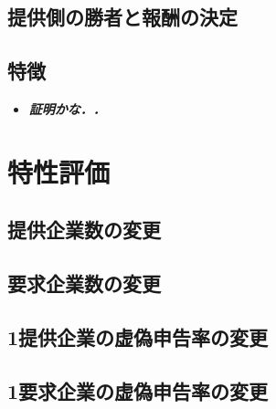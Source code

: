 \hypertarget{ux63d0ux4f9bux5074ux306eux52ddux8005ux3068ux5831ux916cux306eux6c7aux5b9a}{%
\subsection{提供側の勝者と報酬の決定}\label{ux63d0ux4f9bux5074ux306eux52ddux8005ux3068ux5831ux916cux306eux6c7aux5b9a}}

\hypertarget{ux7279ux5fb4-1}{%
\subsection{特徴}\label{ux7279ux5fb4-1}}

\begin{itemize}
\tightlist
\item
  \textbf{\emph{証明かな．．}}
\end{itemize}

\hypertarget{ux7279ux6027ux8a55ux4fa1-1}{%
\section{特性評価}\label{ux7279ux6027ux8a55ux4fa1-1}}

\hypertarget{ux63d0ux4f9bux4f01ux696dux6570ux306eux5909ux66f4}{%
\subsection{提供企業数の変更}\label{ux63d0ux4f9bux4f01ux696dux6570ux306eux5909ux66f4}}

\hypertarget{ux8981ux6c42ux4f01ux696dux6570ux306eux5909ux66f4}{%
\subsection{要求企業数の変更}\label{ux8981ux6c42ux4f01ux696dux6570ux306eux5909ux66f4}}

\hypertarget{ux63d0ux4f9bux4f01ux696dux306eux865aux507dux7533ux544aux7387ux306eux5909ux66f4-1}{%
\subsection{1提供企業の虚偽申告率の変更}\label{ux63d0ux4f9bux4f01ux696dux306eux865aux507dux7533ux544aux7387ux306eux5909ux66f4-1}}

\hypertarget{ux8981ux6c42ux4f01ux696dux306eux865aux507dux7533ux544aux7387ux306eux5909ux66f4-1}{%
\subsection{1要求企業の虚偽申告率の変更}\label{ux8981ux6c42ux4f01ux696dux306eux865aux507dux7533ux544aux7387ux306eux5909ux66f4-1}}

